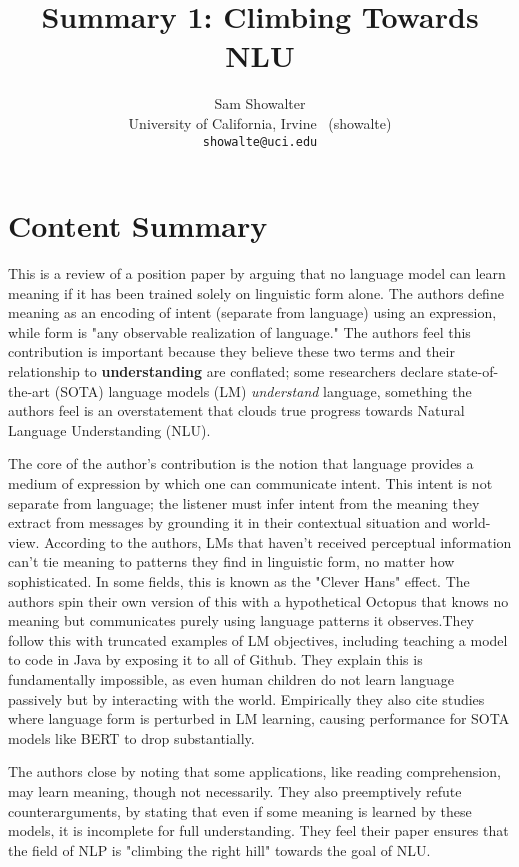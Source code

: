 \documentclass[11pt,a4paper]{article}
\title{Summary 1: Climbing Towards NLU}
\author{Sam Showalter \\
  University of California, Irvine \ (showalte) \\  
\texttt{showalte@uci.edu}}
\begin{document}
\maketitle

\section{Content Summary}
\vspace{-1pt}
\label{sec:content_summary}

This is a review of a position paper by \cite{bender2020climbing} arguing 
that no language model can learn meaning if it has been trained 
solely on linguistic form alone. The authors define meaning as
an encoding of intent (separate from language) using an expression, while form is
"any observable realization of language." The authors feel
this contribution is important because they believe these two terms and their relationship
to \textbf{understanding} are conflated; some researchers declare state-of-the-art (SOTA)
language models (LM) \textit{understand} language, something the authors feel is an 
overstatement that clouds true progress towards Natural Language Understanding (NLU).


The core of the author's contribution is the notion that language provides a medium of expression
by which one can communicate intent. This intent is not separate from language; the listener 
must infer intent from the meaning they extract from messages by grounding it in their contextual situation 
and world-view. According to the authors, LMs that haven't received perceptual information can't tie meaning to patterns they find in linguistic form, no matter how sophisticated. In some fields, this is known as the "Clever Hans" effect. The authors spin their own version of this with a hypothetical Octopus that knows no meaning but communicates purely using language patterns it observes.They follow this with truncated examples of LM objectives, including teaching a model to code in Java by exposing it to all of Github. They explain this is fundamentally impossible, as even human children do not learn language passively but by interacting with the world. Empirically
they also cite studies where language form is perturbed in LM learning,
causing performance for SOTA models like BERT to drop substantially. 

The authors close by noting that some applications, like reading comprehension, may learn meaning, though not necessarily. They also preemptively refute counterarguments, by stating that even
if some meaning is learned by these models, it is incomplete for full understanding. They feel their paper ensures that the field of NLP is "climbing the right hill" towards the goal of NLU.
\end{document}
